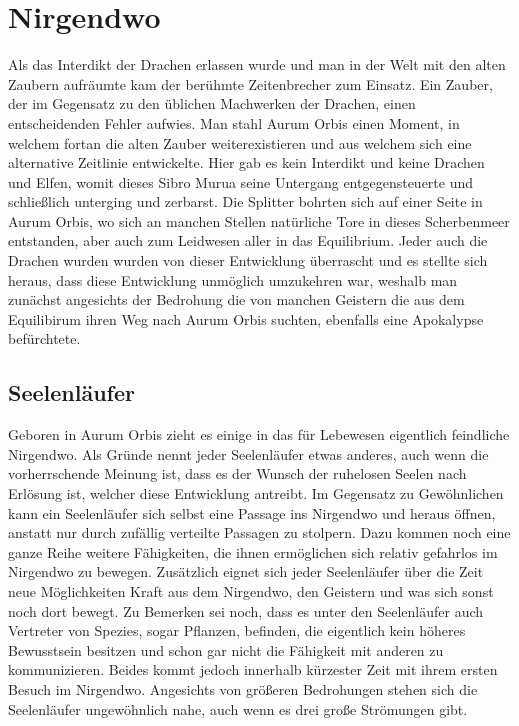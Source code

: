\documentclass[a4paper,12pt,oneside]{book}
\begin{document}
\chapter{Nirgendwo}
Als das Interdikt der Drachen erlassen wurde und man in der Welt mit den alten Zaubern aufräumte kam der berühmte Zeitenbrecher zum Einsatz. Ein Zauber, der im Gegensatz zu den üblichen Machwerken der Drachen, einen entscheidenden Fehler aufwies. Man stahl Aurum Orbis einen Moment, in welchem fortan die alten Zauber weiterexistieren und aus welchem sich eine alternative Zeitlinie entwickelte. Hier gab es kein Interdikt und keine Drachen und Elfen, womit dieses Sibro Murua seine Untergang entgegensteuerte und schließlich unterging und zerbarst. Die Splitter bohrten sich auf einer Seite in Aurum Orbis, wo sich an manchen Stellen natürliche Tore in dieses Scherbenmeer entstanden, aber auch zum Leidwesen aller in das Equilibrium. Jeder auch die Drachen wurden wurden von dieser Entwicklung überrascht und es stellte sich heraus, dass diese Entwicklung unmöglich umzukehren war, weshalb man zunächst angesichts der Bedrohung die von manchen Geistern die aus dem Equilibirum ihren Weg nach Aurum Orbis suchten, ebenfalls eine Apokalypse befürchtete.

\section{Seelenläufer}
Geboren in Aurum Orbis zieht es einige in das für Lebewesen eigentlich feindliche Nirgendwo. Als Gründe nennt jeder Seelenläufer etwas anderes, auch wenn die vorherrschende Meinung ist, dass es der Wunsch der ruhelosen Seelen nach Erlösung ist, welcher diese Entwicklung antreibt. Im Gegensatz zu Gewöhnlichen kann ein Seelenläufer sich selbst eine Passage ins Nirgendwo und heraus öffnen, anstatt nur durch zufällig verteilte Passagen zu stolpern. Dazu kommen noch eine ganze Reihe weitere Fähigkeiten, die ihnen ermöglichen sich relativ gefahrlos im Nirgendwo zu bewegen. Zusätzlich eignet sich jeder Seelenläufer über die Zeit neue Möglichkeiten Kraft aus dem Nirgendwo, den Geistern und was sich sonst noch dort bewegt. Zu Bemerken sei noch, dass es unter den Seelenläufer auch Vertreter von Spezies, sogar Pflanzen, befinden, die eigentlich kein höheres Bewusstsein besitzen und schon gar nicht die Fähigkeit mit anderen zu kommunizieren. Beides kommt jedoch innerhalb kürzester Zeit mit ihrem ersten Besuch im Nirgendwo. Angesichts von größeren Bedrohungen stehen sich die Seelenläufer ungewöhnlich nahe, auch wenn es drei große Strömungen gibt.
\end{document}
